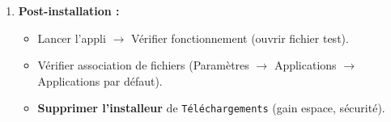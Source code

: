 \documentclass[11pt]{article}
\begin{document}
\begin{methode}
\begin{enumerate}
\begin{enumerate}
                  \item Terminer. \textbf{Ne pas lancer l'appli tout de suite.}
              \end{enumerate}
        \item \textbf{Post-installation :}
              \begin{itemize}
                  \item Lancer l'appli $\rightarrow$ Vérifier fonctionnement (ouvrir fichier test).
                  \item Vérifier association de fichiers (Paramètres $\rightarrow$ Applications $\rightarrow$ Applications par défaut).
                  \item \textbf{Supprimer l'installeur} de \texttt{Téléchargements} (gain espace, sécurité).
              \end{itemize}
    \end{enumerate}
\end{methode}
\end{document}
